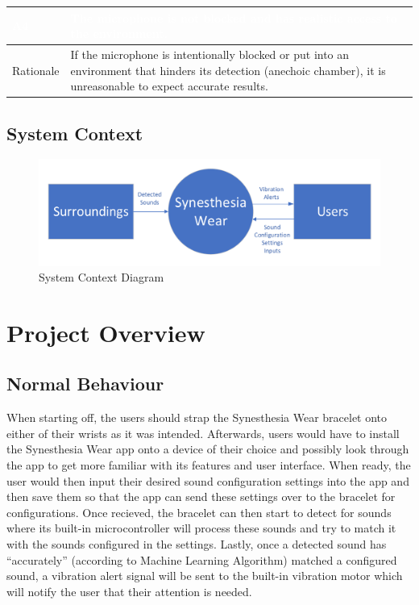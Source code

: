 \documentclass[12pt, titlepage]{article}
\begin{document}
\begin{table}[H]
  \centering
  \begin{tabular}{|p{3cm}|p{11cm}|} 
  \hline
  \rowcolor[rgb]{0.071,0.49,0.698} \textcolor{white}{A4} & \textcolor{white}{The microphone is not blocked and has realistic access to the environment.}                                          \\ 
  \hline
  \rowcolor[rgb]{0.675,0.827,0.902} Rationale               & If the microphone is intentionally blocked or put into an environment that hinders its detection (anechoic chamber), it is unreasonable to expect accurate results.\\
  \hline
  \end{tabular}
\end{table}




\subsection {System Context}
\begin{figure}[H]
  \includegraphics[width=\textwidth,height=\textheight,keepaspectratio]{ContextDiagram.pdf}
  \caption{System Context Diagram}
  \label{ContextDiagram} 
\end{figure}

\section{Project Overview}

\subsection{Normal Behaviour}
When starting off, the users should strap the Synesthesia Wear bracelet onto either of their wrists as it was intended.
Afterwards, users would have to install the Synesthesia Wear app onto a device of their choice and possibly look through the app 
to get more familiar with its features and user interface. When ready, the user would then input their desired sound configuration 
settings into the app and then save them so that the app can send these settings over to the bracelet for configurations.
Once recieved, the bracelet can then start to detect for sounds where its built-in microcontroller will process these sounds and try to 
match it with the sounds configured in the settings. Lastly, once a detected sound has ``accurately'' (according to Machine Learning Algorithm) matched a configured sound, a vibration 
alert signal will be sent to the built-in vibration motor which will notify the user that their attention is needed.
\end{document}
